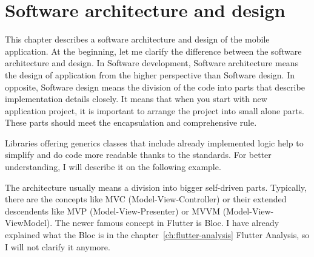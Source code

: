 \chapter{Software architecture and design}\label{ch:software-architecture-and-design}
This chapter describes a software architecture and design of the mobile application.
At the beginning, let me clarify the difference between the software architecture and design.
In Software development, Software architecture means the design of application from the higher perspective than Software design.
In opposite, Software design means the division of the code into parts that describe implementation details closely.
It means that when you start with new application project, it is important to arrange the project into small alone parts.
These parts should meet the encapsulation and comprehensive rule.

Libraries offering generics classes that include already implemented logic help to simplify and do code more readable thanks to the standards.
For better understanding, I will describe it on the following example.

The architecture usually means a division into bigger self-driven parts.
Typically, there are the concepts like MVC (Model-View-Controller) or their extended descendents like MVP (Model-View-Presenter) or MVVM (Model-View-ViewModel).
The newer famous concept in Flutter is Bloc.
I have already explained what the Bloc is in the chapter~\ref{ch:flutter-analysis} Flutter Analysis, so I will not clarify it anymore.



